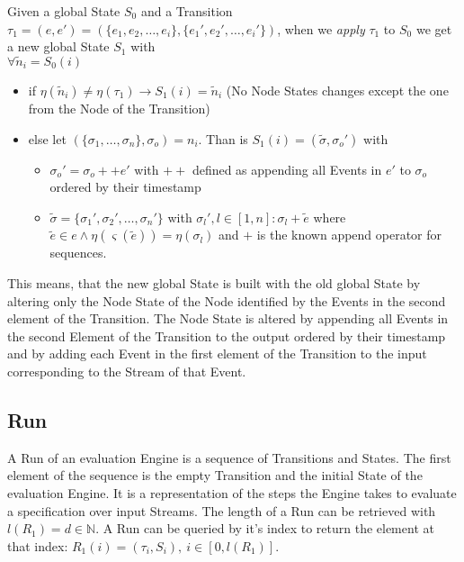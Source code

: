 \begin{definition}[name = Application of a Transition on a State]\label{sec:concepts:def:application_transition}
  Given a global State \(S_0\) and a Transition \(\tau_1 = (e, e') = (\{e_1,e_2,\dots,e_i\}, \{e_1',e_2',\dots,e_i'\})\), when we \emph{apply} \(\tau_1\) to \(S_0\) we get a new global State \(S_1\) with\\
  \(\forall \widetilde{n}_i = S_0(i)\)
  \begin{itemize}
    \item if \(\eta(\widetilde{n}_i) \neq \eta(\tau_1) \rightarrow S_1(i) = \widetilde{n}_i\) (No Node States changes except the one from the Node of the Transition)
    \item else let \((\{\sigma_1,\dots,\sigma_n\}, \sigma_o) = n_i\). Than is \(S_1(i) = (\widetilde{\sigma}, \sigma_o')\) with
      \begin{itemize}
        \item \(\sigma_o' = \sigma_o ++ e'\) with \(++\) defined as appending all Events in \(e'\) to \(\sigma_o\) ordered by their timestamp
        \item \(\widetilde{\sigma} = \{\sigma_1', \sigma_2', \dots, \sigma_n'\}\) with \(\sigma_l', l \in [1,n]: \sigma_l + \widetilde{e}\) where \(\widetilde{e} \in e \land \eta(\varsigma(\widetilde{e})) = \eta(\sigma_l)\) and \(+\) is the known append operator for sequences.
      \end{itemize}
  \end{itemize}

\end{definition}
This means, that the new global State is built with the old global State by altering only the Node State of the Node identified by the Events in the second element of the Transition.
The Node State is altered by appending all Events in the second Element of the Transition to the output ordered by their timestamp and by adding each Event in the first element of the Transition to the input corresponding to the Stream of that Event.

\subsection{Run}
\label{sec:concepts:def:run}

A Run of an evaluation Engine is a sequence of Transitions and States.
The first element of the sequence is the empty Transition and the initial State of the evaluation Engine.
It is a representation of the steps the Engine takes to evaluate a specification over input Streams.
The length of a Run can be retrieved with \(l(R_1) = d \in \mathbb{N}\).
A Run can be queried by it's index to return the element at that index: \(R_1(i)=(\tau_i, S_i),\ i \in [0, l(R_1)]\).

